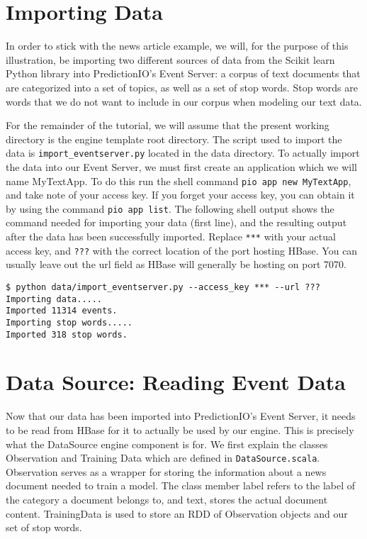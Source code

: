 \documentclass[a4paper,12pt]{article}
\renewcommand{\tt}[1]{\texttt{#1}}
\newcommand{\3}{\left}
\newcommand{\4}{\right}
\renewcommand{\-}[1]{{}^{-#1}}
\begin{document}
\section*{Importing Data}

In order to stick with the news article example, we will, for the purpose of this illustration, be importing two different sources of data from the Scikit learn Python library into PredictionIO's Event Server: a corpus of text documents that are categorized into a set of topics, as well as a set of stop words. Stop words are words that we do not want to include in our corpus when modeling our text data. 

For the remainder of the tutorial, we will assume that the present working directory is the engine template root directory. The script used to import the data is \tt{import\_eventserver.py} located in the data directory. To actually import the data into our Event Server, we must first create an application which we will name MyTextApp. To do this run the shell command \tt{pio app new MyTextApp}, and take note of your access key. If you forget your access key, you can obtain it by using the command \tt{pio app list}. The following shell output shows the command needed for importing your data (first line), and the resulting output after the data has been successfully imported. Replace \tt{***} with your actual access key, and \tt{???} with the correct location of the port hosting HBase. You can usually leave out the url field as HBase will generally be hosting on port 7070.

\begin{verbatim}
$ python data/import_eventserver.py --access_key *** --url ???
Importing data.....
Imported 11314 events.
Importing stop words.....
Imported 318 stop words.
 \end{verbatim}

\section*{Data Source: Reading Event Data}

Now that our data has been imported into PredictionIO's Event Server, it needs to be read from HBase for it to actually be used by our engine. This is precisely what the DataSource engine component is for. We first explain the classes Observation and Training Data which are defined in \tt{DataSource.scala}. Observation serves as a wrapper for storing the information about a news document needed to train a model. The class member label refers to the label of the category a document belongs to, and text, stores the actual document content. TrainingData is used to store an RDD of Observation objects and our set of stop words. 
\end{document}
